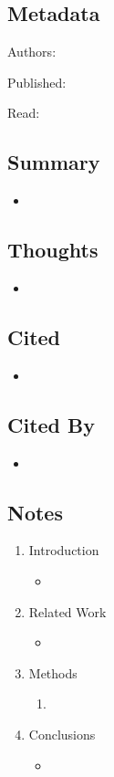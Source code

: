 \documentclass{article}
\begin{document}
\subsection*{Metadata}

\noindent Authors: 

\noindent Published:

\noindent Read:

\subsection*{Summary}
\begin{itemize}
	\item
\end{itemize}

\subsection*{Thoughts}
\begin{itemize}
	\item
\end{itemize}

\subsection*{Cited}
\begin{itemize}
	\item
\end{itemize}

\subsection*{Cited By}
\begin{itemize}
	\item
\end{itemize}

\subsection*{Notes}

\begin{enumerate}
	\item Introduction
	\begin{itemize}
		\item 
	\end{itemize}
	\item Related Work
	\begin{itemize}
		\item 
	\end{itemize}
	\item Methods
	\begin{enumerate}
		\item 
	\end{enumerate}
	\item Conclusions
	\begin{itemize}
		\item 
	\end{itemize}
\end{enumerate}
\end{document}
